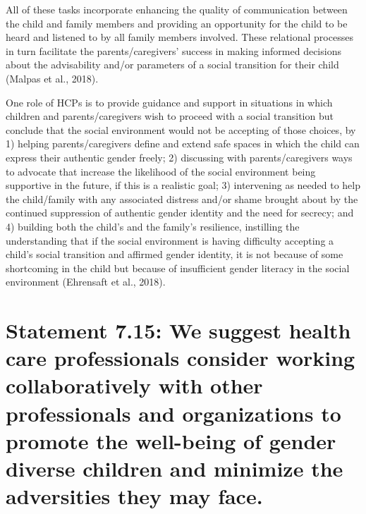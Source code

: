 \documentclass[
]{book}
\begin{document}
All of these tasks incorporate enhancing the
quality of communication between the child and
family members and providing an opportunity
for the child to be heard and listened to by all
family members involved. These relational processes in turn facilitate the parents/caregivers'
success in making informed decisions about the
advisability and/or parameters of a social transition for their child (Malpas et al., 2018).

One role of HCPs is to provide guidance and
support in situations in which children and parents/caregivers wish to proceed with a social transition but conclude that the social environment
would not be accepting of those choices, by 1)
helping parents/caregivers define and extend safe
spaces in which the child can express their authentic gender freely; 2) discussing with parents/caregivers ways to advocate that increase the likelihood
of the social environment being supportive in the
future, if this is a realistic goal; 3) intervening as
needed to help the child/family with any associated
distress and/or shame brought about by the continued suppression of authentic gender identity
and the need for secrecy; and 4) building both
the child's and the family's resilience, instilling the
understanding that if the social environment is
having difficulty accepting a child's social transition and affirmed gender identity, it is not because
of some shortcoming in the child but because of
insufficient gender literacy in the social environment (Ehrensaft et al., 2018).

\hypertarget{statement-7.15-we-suggest-health-care-professionals-consider-working-collaboratively-with-other-professionals-and-organizations-to-promote-the-well-being-of-gender-diverse-children-and-minimize-the-adversities-they-may-face.}{%
\section*{Statement 7.15: We suggest health care professionals consider working collaboratively with other professionals and organizations to promote the well-being of gender diverse children and minimize the adversities they may face.}\label{statement-7.15-we-suggest-health-care-professionals-consider-working-collaboratively-with-other-professionals-and-organizations-to-promote-the-well-being-of-gender-diverse-children-and-minimize-the-adversities-they-may-face.}}
\end{document}
